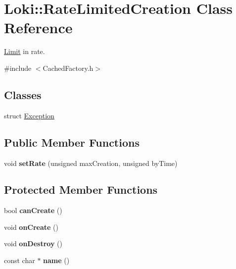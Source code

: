 \hypertarget{classLoki_1_1RateLimitedCreation}{}\section{Loki\+:\+:Rate\+Limited\+Creation Class Reference}
\label{classLoki_1_1RateLimitedCreation}


\hyperlink{classLimit}{Limit} in rate.  




{\ttfamily \#include $<$Cached\+Factory.\+h$>$}

\subsection*{Classes}
\begin{DoxyCompactItemize}
\item 
struct \hyperlink{structLoki_1_1RateLimitedCreation_1_1Exception}{Exception}
\end{DoxyCompactItemize}
\subsection*{Public Member Functions}
\begin{DoxyCompactItemize}
\item 
\hypertarget{classLoki_1_1RateLimitedCreation_a8e12d2e7e301faf81ada4e7d6b509635}{}void {\bfseries set\+Rate} (unsigned max\+Creation, unsigned by\+Time)\label{classLoki_1_1RateLimitedCreation_a8e12d2e7e301faf81ada4e7d6b509635}

\end{DoxyCompactItemize}
\subsection*{Protected Member Functions}
\begin{DoxyCompactItemize}
\item 
\hypertarget{classLoki_1_1RateLimitedCreation_a36485819e1d274e5a70c8a9430503263}{}bool {\bfseries can\+Create} ()\label{classLoki_1_1RateLimitedCreation_a36485819e1d274e5a70c8a9430503263}

\item 
\hypertarget{classLoki_1_1RateLimitedCreation_ad1946e93bf52f52a55d0b5303c3c3d35}{}void {\bfseries on\+Create} ()\label{classLoki_1_1RateLimitedCreation_ad1946e93bf52f52a55d0b5303c3c3d35}

\item 
\hypertarget{classLoki_1_1RateLimitedCreation_a2e6ea4404c927e369ee86d79a07992bc}{}void {\bfseries on\+Destroy} ()\label{classLoki_1_1RateLimitedCreation_a2e6ea4404c927e369ee86d79a07992bc}

\item 
\hypertarget{classLoki_1_1RateLimitedCreation_a71e5b536754af404d77eb643cbb9742b}{}const char $\ast$ {\bfseries name} ()\label{classLoki_1_1RateLimitedCreation_a71e5b536754af404d77eb643cbb9742b}

\end{DoxyCompactItemize}



